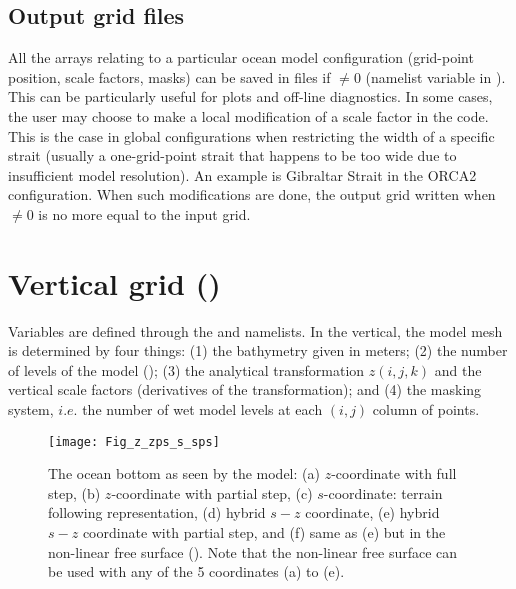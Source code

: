 \documentclass[../main/NEMO_manual]{subfiles}
\begin{document}
\subsection{Output grid files}
\label{subsec:DOM_hgr_files}

All the arrays relating to a particular ocean model configuration (grid-point position, scale factors, masks)
can be saved in files if  $\not= 0$ (namelist variable in ).
This can be particularly useful for plots and off-line diagnostics.
In some cases, the user may choose to make a local modification of a scale factor in the code.
This is the case in global configurations when restricting the width of a specific strait
(usually a one-grid-point strait that happens to be too wide due to insufficient model resolution).
An example is Gibraltar Strait in the ORCA2 configuration.
When such modifications are done,
the output grid written when  $\not= 0$ is no more equal to the input grid.

\section{Vertical grid (\protect{})}
\label{sec:DOM_zgr}
%


Variables are defined through the  and  namelists.
In the vertical, the model mesh is determined by four things: 
(1) the bathymetry given in meters; 
(2) the number of levels of the model (); 
(3) the analytical transformation $z(i,j,k)$ and the vertical scale factors (derivatives of the transformation); and
(4) the masking system, $i.e.$ the number of wet model levels at each 
$(i,j)$ column of points.

\begin{figure}[!tb]
  \begin{center}
    \texttt{[image: Fig\_z\_zps\_s\_sps]}
    \caption{
      \protect\label{fig:z_zps_s_sps}
      The ocean bottom as seen by the model:
      (a) $z$-coordinate with full step,
      (b) $z$-coordinate with partial step,
      (c) $s$-coordinate: terrain following representation,
      (d) hybrid $s-z$ coordinate,
      (e) hybrid $s-z$ coordinate with partial step, and
      (f) same as (e) but in the non-linear free surface (\protect{}).
      Note that the non-linear free surface can be used with any of the 5 coordinates (a) to (e).
    }
  \end{center}
\end{figure}
\end{document}
